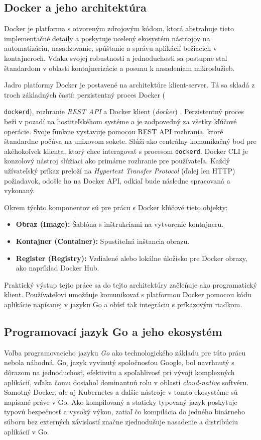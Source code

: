 \documentclass[
 program=infpvs,
  language=slovak,
  figures=false,
  tables=false,
  sourcecodes,
  glossaries,
  index
]{kidiplom}
\begin{document}
\subsection{Docker a jeho architektúra}  \label{sec:docker-arch}
Docker je platforma s otvoreným zdrojovým kódom, ktorá abstrahuje tieto implementačné detaily a poskytuje ucelený ekosystém nástrojov na automatizáciu, nasadzovanie, spúšťanie a správu aplikácií bežiacich v kontajneroch. Vďaka svojej robustnosti a jednoduchosti sa postupne stal štandardom v oblasti kontajnerizácie a posunu k nasadeniam mikroslužieb.

Jadro platformy Docker je postavené na architektúre klient-server. Tá sa skladá z troch základných častí: perzistentný proces Docker ({\texttt{dockerd}), rozhranie \textit{REST API} a Docker klient (\textit{docker}) \cite{docker-overview}. Perzistentný proces beží v pozadí na hostiteľskéhom systéme a je zodpovedný za všetky kľúčové operácie. Svoje funkcie vystavuje pomocou REST API rozhrania, ktoré štandardne počúva na unixovom sokete. Slúži ako centrálny komunikačný bod pre akéhokoľvek klienta, ktorý chce interagovať s procesom \texttt{dockerd}. Docker CLI je konzolový nástroj slúžiaci ako primárne rozhranie pre používateľa. Každý užívateľský príkaz preloží na \textit{Hypertext Transfer Protocol} (ďalej len HTTP) požiadavok, odošle ho na Docker API, odkiaľ bude následne spracovaná a vykonaný.

Okrem týchto komponentov sú pre prácu s Docker kľúčové tieto objekty:
\begin{itemize}
    \item \textbf{Obraz (Image):} Šablóna s inštrukciami na vytvorenie kontajneru. \cite{docker-container}
    \item \textbf{Kontajner (Container):} Spustiteľná inštancia obrazu. \cite{docker-image}
    \item \textbf{Register (Registry):} Vzdialené alebo lokálne úložisko pre Docker obrazy, ako napríklad Docker Hub. \cite{docker-registry}
\end{itemize}

Praktický výstup tejto práce sa do tejto architektúry začleňuje ako programatický klient. Používateľovi umožňuje komunikovať s platformou Docker pomocou kódu aplikácie napísanej v jazyku Go a obísť tak integráciu s príkazovým riadkom.



\subsection{Programovací jazyk Go a jeho ekosystém}  \label{sec:jazyk-go}
Voľba programovacieho jazyku \textit{Go} ako technologického základu pre túto prácu nebola náhodná. Go, jazyk vyvinutý spoločnosťou Google, bol navrhnutý s dôrazom na jednoduchosť, efektivitu a spoľahlivosť pri vývoji komplexných aplikácií, vďaka čomu dosiahol dominantnú rolu v oblasti \textit{cloud-native} softvéru. Samotný Docker, ale aj Kubernetes a ďalšie nástroje v tomto ekosystéme sú napísané práve v Go. Ako kompilovaný a staticky typovaný jazyk poskytuje typovú bezpečnosť a vysoký výkon, zatiaľ čo kompilácia do jedného binárneho súboru bez externých závislostí značne zjednodušuje nasadenie a distribúciu aplikácií v Go.

}
\end{document}

